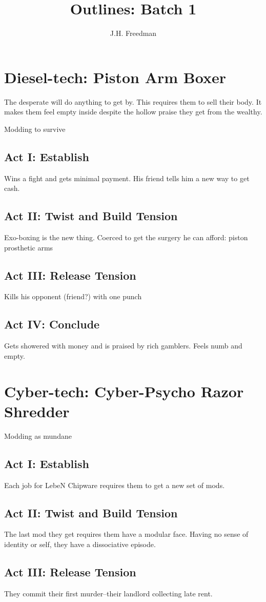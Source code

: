 \documentclass[]{article}
\title{Outlines: Batch 1}
\author{J.H. Freedman}
\newcommand{\megacorpC}{LebeN Chipware }
\begin{document}
\maketitle

\section{Diesel-tech: Piston Arm Boxer}
The desperate will do anything to get by. This requires them to sell their body. It makes them feel empty inside despite the hollow praise they get from the wealthy.

Modding to survive
\subsection*{Act I: Establish}
Wins a fight and gets minimal payment. His friend tells him a new way to get cash.
\subsection*{Act II: Twist and Build Tension}
Exo-boxing is the new thing. Coerced to get the surgery he can afford: piston prosthetic arms 
\subsection*{Act III: Release Tension}
Kills his opponent (friend?) with one punch
\subsection*{Act IV: Conclude}
Gets showered with money and is praised by rich gamblers. Feels numb and empty.

\section{Cyber-tech: Cyber-Psycho Razor Shredder}
Modding as mundane
\subsection*{Act I: Establish}
Each job for \megacorpC requires them to get a new set of mods. 
\subsection*{Act II: Twist and Build Tension}
The last mod they get requires them have a modular face. Having no sense of identity or self, they have a dissociative episode.
\subsection*{Act III: Release Tension}
They commit their first murder--their landlord collecting late rent. 
\end{document}
